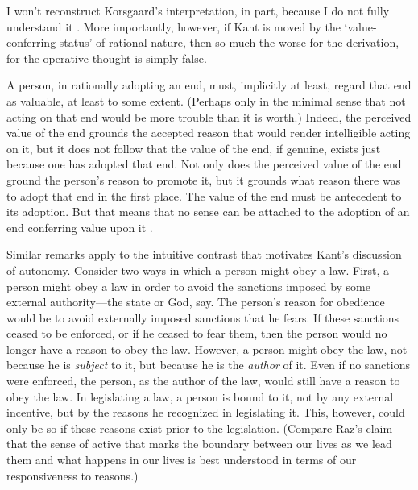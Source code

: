 \documentclass[12pt]{article}
\begin{document}
I won't reconstruct Korsgaard's interpretation, in part, because I do not fully understand it \citep[though, for an elaboration, see][]{Wood:1999zy}. More importantly, however, if Kant is moved by the `value-conferring status' of rational nature, then so much the worse for the derivation, for the operative thought is simply false.

A person, in rationally adopting an end, must, implicitly at least, regard that end as valuable, at least to some extent. (Perhaps only in the minimal sense that not acting on that end would be more trouble than it is worth.) Indeed, the perceived value of the end grounds the accepted reason that would render intelligible acting on it, but it does not follow that the value of the end, if genuine, exists just because one has adopted that end. Not only does the perceived value of the end ground the person's reason to promote it, but it grounds what reason there was to adopt that end in the first place. The value of the end must be antecedent to its adoption. But that means that no sense can be attached to the adoption of an end conferring value upon it \citep[see][]{Scanlon:2004ac}.

Similar remarks apply to the intuitive contrast that motivates Kant's discussion of autonomy. Consider two ways in which a person might obey a law. First, a person might obey a law in order to avoid the sanctions imposed by some external authority---the state or God, say. The person's reason for obedience would be to avoid externally imposed sanctions that he fears. If these sanctions ceased to be enforced, or if he ceased to fear them, then the person would no longer have a reason to obey the law. However, a person might obey the law, not because he is {\itshape subject} to it, but because he is the {\itshape author} of it. Even if no sanctions were enforced, the person, as the author of the law, would still have a reason to obey the law. In legislating a law, a person is bound to it, not by any external incentive, but by the reasons he recognized in legislating it. This, however, could only be so if these reasons exist prior to the legislation. (Compare Raz's \citeyear{Raz:2001kx} claim that the sense of active that marks the boundary between our lives as we lead them and what happens in our lives is best understood in terms of our responsiveness to reasons.)
\end{document}
